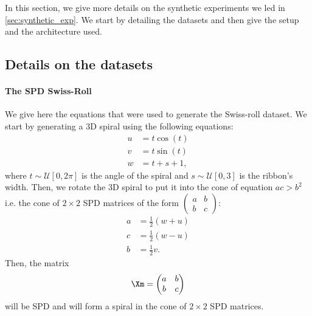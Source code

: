 \documentclass[10pt]{article} %
\theoremstyle{plain}
\theoremstyle{definition}
\theoremstyle{remark}
\begin{document}
In this section, we give more details on the synthetic experiments we led in \cref{sec:synthetic_exp}. We start by detailing the datasets and then give the setup and the architecture used.

\subsection{Details on the datasets}
\paragraph{The SPD Swiss-Roll}
We give here the equations that were used to generate the Swiss-roll dataset. We start by generating a 3D spiral using the following equations:
\begin{equation}
  \begin{aligned}
    u &= t\cos(t) \\
    v &= t\sin(t) \\
    w &= t + s + 1,
  \end{aligned}
\end{equation}
where $t \sim \mathcal{U}[0, 2\pi]$ is the angle of the spiral and $s \sim \mathcal{U}[0, 3]$ is the ribbon's width. Then, we rotate the 3D spiral to put it into the cone of equation $ac > b^2$ i.e. the cone of $2 \times 2$ SPD matrices of the form $
\begin{pmatrix}a&b\\b&c
\end{pmatrix}$:
\begin{equation}
  \begin{aligned}
    a &= \frac{1}{2}(w+u) \\
    c &= \frac{1}{2}(w-u) \\
    b &= \frac{1}{2}v.
  \end{aligned}
\end{equation}
Then, the matrix $$\Xm =
\begin{pmatrix}a&b\\b&c
\end{pmatrix}$$
will be SPD and will form a spiral in the cone of $2 \times 2$ SPD matrices.
\end{document}
